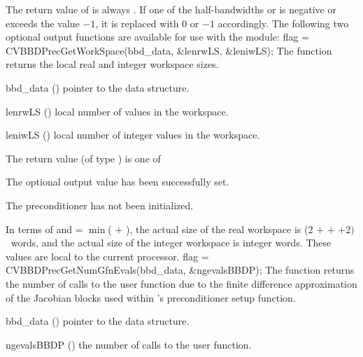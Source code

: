 {
  The return value of  is always .
}
{
  If one of the half-bandwidths  or  is negative or
  exceeds the value $-1$, it is replaced with 0 or
  $-1$ accordingly.
}
The following two optional output functions are available for use with
the {\cvbbdpre} module:
{
  flag = CVBBDPrecGetWorkSpace(bbd\_data, \&lenrwLS, \&leniwLS);
}
{
  The function  returns the local
  {\cvbbdpre} real and integer workspace sizes.
}
{
  \begin{args}[lenrwLS]
  \item[bbd\_data] ()
    pointer to the {\cvbbdpre} data structure.
  \item[lenrwLS] ()
    local number of  values in the {\cvbbdpre} workspace.
  \item[leniwLS] ()
    local number of integer values in the {\cvbbdpre} workspace.
  \end{args}
}
{
  The return value  (of type ) is one of
  \begin{args}
  \item[\Id{CV\_SUCCESS}] 
    The optional output value has been successfully set.
  \item[\Id{CV\_PDATA\_NULL}]
    The {\cvbbdpre} preconditioner has not been initialized.
  \end{args}
}
{
  In terms of  and
   = $\min$( $+$ ),
  the actual size of the real workspace is
  (2  $+$  $+$  $+2) \, $ $~$
   words, and the actual size of the integer workspace is
   integer words.  These values are local to the current processor.
}
{
  flag = CVBBDPrecGetNumGfnEvals(bbd\_data, \&ngevalsBBDP);
}
{
  The function  returns the
  number of calls to the user  function due to the 
  finite difference approximation of the Jacobian blocks used within
  {\cvbbdpre}'s preconditioner setup function.
}
{
  \begin{args}[ngevalsBBDP]
  \item[bbd\_data] ()
    pointer to the {\cvbbdpre} data structure.
  \item[ngevalsBBDP] ()
    the number of calls to the user  function.
  \end{args}
}

